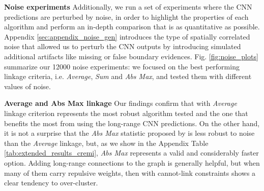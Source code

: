 

\textbf{Noise experiments }  Additionally, we run a set of experiments where the CNN predictions are perturbed by noise, in order to highlight the properties of each \algname{} algorithm and perform an in-depth comparison that is as quantitative as possible. Appendix \ref{sec:appendix_noise_gen} introduces the type of spatially correlated noise that allowed us to perturb the CNN outputs by introducing simulated additional artifacts like missing or false boundary evidences.  
Fig. \ref{fig:noise_plots} summarize our 12000 noise experiments: we focused on the best performing linkage criteria, i.e. \emph{Average}, \emph{Sum} and \emph{Abs Max}, and tested them with different values of noise. %

\textbf{Average and Abs Max linkage } Our findings confirm that \algname{} with \emph{Average} linkage criterion represents the most robust algorithm tested and the one that benefits the most from using the long-range CNN predictions. On the other hand, it is not a surprise that the \emph{Abs Max} statistic proposed by \cite{wolf2018mutex} is less robust to noise than the \emph{Average} linkage, but, as we show in the Appendix Table \ref{tab:extended_results_cremi}, \emph{Abs Max} represents a valid and considerably faster option. 
Adding long-range connections to the graph is generally helpful, but when many of them carry repulsive weights, then \algname{} with cannot-link constraints shows a clear tendency to over-cluster.    

